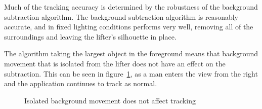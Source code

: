 Much of the tracking accuracy is determined by the robustness of the background subtraction algorithm. The background subtraction algorithm is reasonably accurate, and in fixed lighting conditions performs very well, removing all of the surroundings and leaving the lifter's silhouette in place.

The algorithm taking the largest object in the foreground means that background movement that is isolated from the lifter does not have an effect on the subtraction. This can be seen in figure~\ref{fig:goodbackground}, as a man enters the view from the right and the application continues to track as normal.

\begin{figure}[H]
    \centering
\caption{Isolated background movement does not affect tracking}
\label{fig:goodbackground}
\end{figure}

